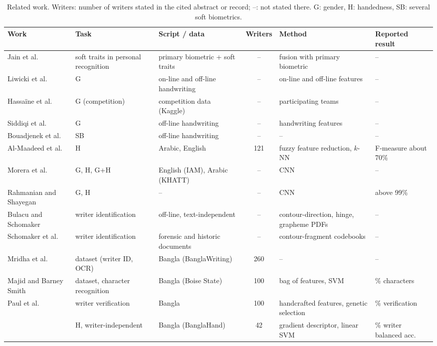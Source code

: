 \documentclass[conference]{IEEEtran}
\begin{document}
\begin{table}[t]
\caption{Related work. Writers: number of writers stated in the cited abstract or record; --: not stated there. G: gender, H: handedness, SB: several soft biometrics.}
\label{tab:related}
\centering\scriptsize
\setlength{\tabcolsep}{3pt}
\begin{tabular}{l>{\raggedright\arraybackslash}p{2.7cm}>{\raggedright\arraybackslash}p{3.1cm}c>{\raggedright\arraybackslash}p{3.4cm}>{\raggedright\arraybackslash}p{2.3cm}}
\toprule
Work & Task & Script / data & Writers & Method & Reported result \\
\midrule
Jain et al.\ \cite{jain2004soft} & soft traits in personal recognition & primary biometric + soft traits & -- & fusion with primary biometric & -- \\
Liwicki et al.\ \cite{liwicki2011gender} & G & on-line and off-line handwriting & -- & on-line and off-line features & -- \\
Hassa\"ine et al.\ \cite{hassaine2013icdar} & G (competition) & competition data (Kaggle) & -- & 194 participating teams & -- \\
Siddiqi et al.\ \cite{siddiqi2015gender} & G & off-line handwriting & -- & handwriting features & -- \\
Bouadjenek et al.\ \cite{bouadjenek2016soft} & SB & off-line handwriting & -- & -- & -- \\
Al-Maadeed et al.\ \cite{almaadeed2016handedness} & H & Arabic, English & 121 & fuzzy feature reduction, $k$-NN & F-measure about 70\% \\
Morera et al.\ \cite{morera2018handedness} & G, H, G+H & English (IAM), Arabic (KHATT) & -- & CNN & -- \\
Rahmanian and Shayegan \cite{rahmanian2021handedness} & G, H & -- & -- & CNN & above 99\% \\
Bulacu and Schomaker \cite{bulacu2007text} & writer identification & off-line, text-independent & -- & contour-direction, hinge, grapheme PDFs & -- \\
Schomaker et al.\ \cite{schomaker2007codebooks} & writer identification & forensic and historic documents & -- & contour-fragment codebooks & -- \\
Mridha et al.\ \cite{mridha2021banglawriting} & dataset (writer ID, OCR) & Bangla (BanglaWriting) & 260 & -- & -- \\
Majid and Barney Smith \cite{majid2018bangla} & dataset, character recognition & Bangla (Boise State) & 100 & bag of features, SVM & 95.4\% characters \\
Paul et al.\ \cite{paul2024bangla} & writer verification & Bangla & 100 & handcrafted features, genetic selection & 94.54\% verification \\
\cite{anon2026handedness} & H, writer-independent & Bangla (BanglaHand) & 42 & gradient descriptor, linear SVM & 77.4\% writer balanced acc. \\
\bottomrule
\end{tabular}
\end{table}
\end{document}
